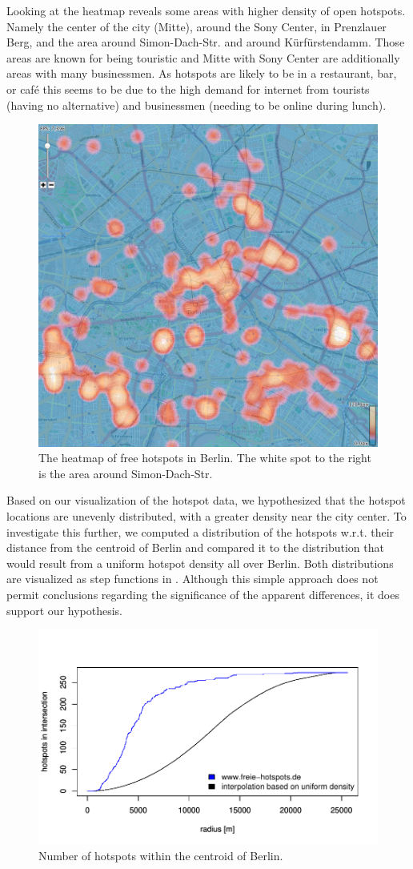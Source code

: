 Looking at the heatmap reveals some areas with higher density of open hotspots.
Namely the center of the city (Mitte), around the Sony Center,
in Prenzlauer Berg, and the area around Simon-Dach-Str.
and around Kürfürstendamm.
Those areas are known for being touristic and Mitte with Sony Center are additionally
areas with many businessmen.
As hotspots are likely to be in a restaurant, bar, or caf\'{e}
this seems to be due to the high demand for internet
from tourists (having no alternative) and businessmen (needing to
be online during lunch).
\begin{figure}
\centering
\includegraphics[width=0.46\linewidth]{imgs/heat}
\caption{The heatmap of free hotspots in Berlin.
The white spot to the right is the area around Simon-Dach-Str.}
\label{fig:heat}
\end{figure}
Based on our visualization of the hotspot data, we hypothesized that the hotspot locations
are unevenly distributed, with a greater density near the city center.
To investigate this further, we computed a distribution of the hotspots w.r.t. their
distance from the centroid of Berlin and compared it to the distribution that would
result from a uniform hotspot density all over Berlin. Both distributions are visualized
as step functions in . Although this simple approach does
not permit conclusions regarding the significance of the apparent differences,
it does support our hypothesis.
\begin{figure}[h]
	\centering
	\includegraphics[scale=0.4]{imgs/wifi_distributions.pdf}
	\caption{Number of hotspots within the centroid of Berlin.}
	\label{fig:wifi_distributions}
\end{figure}

